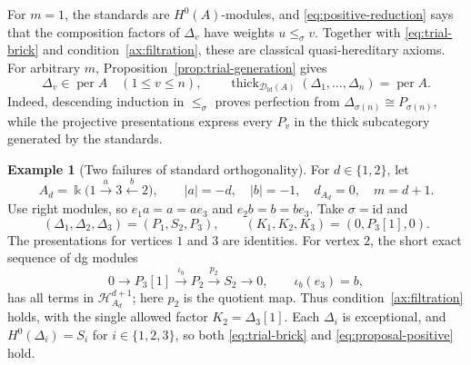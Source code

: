 \documentclass[11pt,a4paper]{article}
\newcommand{\D}{\mathcal D}
\renewcommand{\H}{\mathcal H}
\newcommand{\std}{\Delta}
\DeclareMathOperator{\fd}{fd}
\DeclareMathOperator{\thick}{thick}
\DeclareMathOperator{\per}{per}
\theoremstyle{plain}
\theoremstyle{definition}
\newtheorem{example}[theorem]{Example}
\numberwithin{equation}{section}
\begin{document}
For $m=1$, the standards are $H^0(A)$-modules, and
\eqref{eq:positive-reduction} says that the composition factors of
$\std_v$ have weights $u\leq_\sigma v$. Together with
\eqref{eq:trial-brick} and condition~\ref{ax:filtration}, these are
classical quasi-hereditary axioms. For arbitrary $m$,
Proposition~\ref{prop:trial-generation} gives
\begin{equation}\label{eq:positive-perfect-generation}
 \std_v\in\per A\quad(1\leq v\leq n),\qquad
 \thick_{\D_{\fd}(A)}(\std_1,\ldots,\std_n)=\per A.
\end{equation}
Indeed, descending induction in $\leq_\sigma$ proves perfection
from $\std_{\sigma(n)}\cong P_{\sigma(n)}$, while the projective
presentations express every $P_v$ in the thick subcategory generated
by the standards.

\begin{example}[Two failures of standard orthogonality]
\label{ex:positive-fork}
For $d\in\{1,2\}$, let
\begin{equation}\label{eq:positive-fork-algebra}
 A_d=\Bbbk\bigl(1\xrightarrow{a}3\xleftarrow{b}2\bigr),
 \qquad |a|=-d,\quad |b|=-1,\quad d_{A_d}=0,\quad m=d+1.
\end{equation}
Use right modules, so $e_1a=a=ae_3$ and $e_2b=b=be_3$.
Take $\sigma=\mathrm{id}$ and
\begin{equation}\label{eq:positive-fork-standards}
 (\std_1,\std_2,\std_3)=(P_1,S_2,P_3),\qquad
 (K_1,K_2,K_3)=(0,P_3[1],0).
\end{equation}
The presentations for vertices $1$ and $3$ are identities. For
vertex $2$, the short exact sequence of dg modules
\begin{equation}\label{eq:positive-fork-presentation}
 0\longrightarrow P_3[1]\xrightarrow{\iota_b}P_2
 \xrightarrow{p_2}S_2\longrightarrow0,
 \qquad \iota_b(e_3)=b,
\end{equation}
has all terms in $\H_{A_d}^{d+1}$; here $p_2$ is the quotient map.
Thus condition~\ref{ax:filtration} holds, with the single allowed
factor $K_2=\std_3[1]$. Each $\std_i$ is exceptional, and
$H^0(\std_i)=S_i$ for $i\in\{1,2,3\}$, so both
\eqref{eq:trial-brick} and \eqref{eq:proposal-positive} hold.


\end{example}
\end{document}
